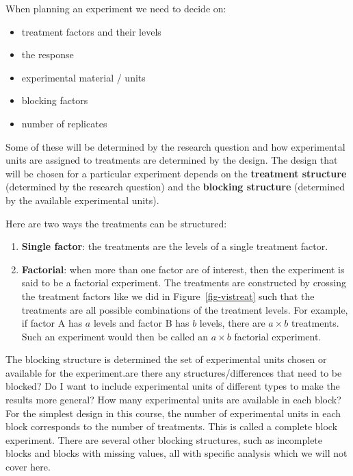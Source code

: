 \documentclass[
  letterpaper,
]{book}
\providecommand{\tightlist}{%
  \setlength{\itemsep}{0pt}\setlength{\parskip}{0pt}}\usepackage{longtable,booktabs,array}
\begin{document}
When planning an experiment we need to decide on:

\begin{itemize}
\tightlist
\item
  treatment factors and their levels
\item
  the response
\item
  experimental material / units
\item
  blocking factors
\item
  number of replicates
\end{itemize}

Some of these will be determined by the research question and how
experimental units are assigned to treatments are determined by the
design. The design that will be chosen for a particular experiment
depends on the \textbf{treatment structure} (determined by the research
question) and the \textbf{blocking structure} (determined by the
available experimental units).

Here are two ways the treatments can be structured:

\begin{enumerate}
\def\labelenumi{\arabic{enumi}.}
\tightlist
\item
  \textbf{Single factor}: the treatments are the levels of a single
  treatment factor.
\item
  \textbf{Factorial}: when more than one factor are of interest, then
  the experiment is said to be a factorial experiment. The treatments
  are constructed by crossing the treatment factors like we did in
  Figure~\ref{fig-vistreat} such that the treatments are all possible
  combinations of the treatment levels. For example, if factor A has
  \(a\) levels and factor B has \(b\) levels, there are \(a \times b\)
  treatments. Such an experiment would then be called an \(a \times b\)
  factorial experiment.
\end{enumerate}

The blocking structure is determined the set of experimental units
chosen or available for the experiment.are there any
structures/differences that need to be blocked? Do I want to include
experimental units of different types to make the results more general?
How many experimental units are available in each block? For the
simplest design in this course, the number of experimental units in each
block corresponds to the number of treatments. This is called a complete
block experiment. There are several other blocking structures, such as
incomplete blocks and blocks with missing values, all with specific
analysis which we will not cover here.
\end{document}
